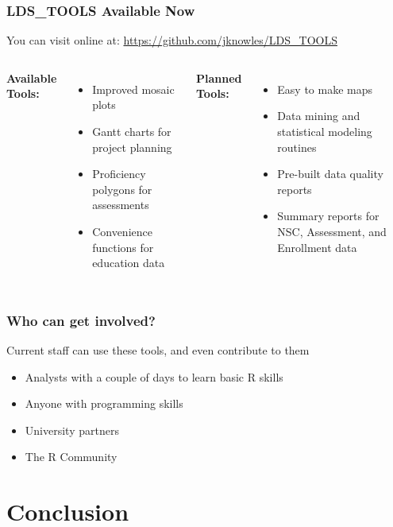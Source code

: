 \documentclass[12pt,handout]{beamer}
\begin{document}
\begin{frame}
\frametitle{LDS\_TOOLS Available Now}
You can visit online at: \textcolor{blue}{\href{https://github.com/jknowles/LDS_TOOLS}{https://github.com/jknowles/LDS\_TOOLS}}
\vspace{.1in}
\begin{columns}
  \textbf{Available Tools:}
    \begin{itemize}
      \item Improved mosaic plots
      \item Gantt charts for project planning
      \item Proficiency polygons for assessments
      \item Convenience functions for education data
    \end{itemize}
  \textbf{Planned Tools:}
    \begin{itemize}
      \item Easy to make maps
      \item Data mining and statistical modeling routines
      \item Pre-built data quality reports
      \item Summary reports for NSC, Assessment, and Enrollment data
    \end{itemize}
\end{columns}
\end{frame}


\begin{frame}
\frametitle{Who can get involved?}
\Large Current staff can use these tools, and even contribute to them
\normalsize
\begin{itemize}
  \item Analysts with a couple of days to learn basic R skills
  \item Anyone with programming skills
  \item University partners
  \item The R Community
\end{itemize}
\end{frame}

\section{Conclusion}
\end{document}
